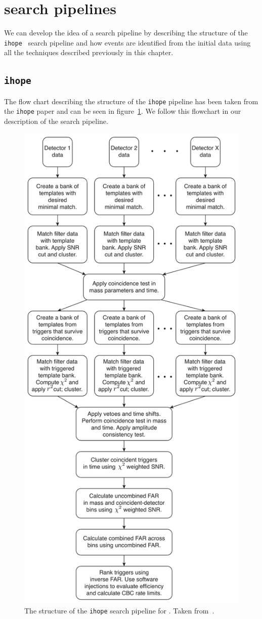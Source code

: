 \section{\label{2:sec:gw-pipelines}\Gwadj search pipelines}

We can develop the idea of a \gwadj search pipeline by describing the structure of the \texttt{ihope}~\cite{IHOPE:2012zx} search pipeline and how \gwadj events are identified from the initial \gwadj data using all the techniques described previously in this chapter.

\subsection{\label{2:sec:searching-for-gw-with-ihope}\texttt{ihope}}
The flow chart describing the structure of the \texttt{ihope} pipeline has been taken from the \texttt{ihope} paper and can be seen in figure~\ref{2:fig:ihope-flowchart}. We follow this flowchart in our description of the search pipeline.
%
\begin{figure}
    \centering
    \includegraphics[width=0.6\linewidth]{images/2_searches/ihope_flowchart.pdf}
    \caption{The structure of the \texttt{ihope} search pipeline for \gws. Taken from~\cite{IHOPE:2012zx}.}
    \label{2:fig:ihope-flowchart}
\end{figure}

